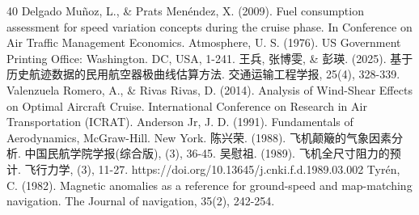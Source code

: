 \documentclass[UTF8]{ctexart}
\begin{document}
\newpage
\begin{thebibliography}{40}
	Delgado Muñoz, L., \& Prats Menéndez, X. (2009). Fuel consumption assessment for speed variation concepts during the cruise phase. In Conference on Air Traffic Management Economics.
	Atmosphere, U. S. (1976). US Government Printing Office: Washington. DC, USA, 1-241.
    王兵, 张博雯, \& 彭瑛. (2025). 基于历史航迹数据的民用航空器极曲线估算方法. 交通运输工程学报, 25(4), 328-339.
	Valenzuela Romero, A., \& Rivas Rivas, D. (2014). Analysis of Wind-Shear Effects on Optimal Aircraft Cruise. International Conference on Research in Air Transportation (ICRAT).
    Anderson Jr, J. D. (1991). Fundamentals of Aerodynamics, McGraw-Hill. New York.
    陈兴荣. (1988). 飞机颠簸的气象因素分析. 中国民航学院学报(综合版), (3), 36-45.
    吴慰祖. (1989). 飞机全尺寸阻力的预计. 飞行力学, (3), 11-27. https://doi.org/10.13645/j.cnki.f.d.1989.03.002
    Tyrén, C. (1982). Magnetic anomalies as a reference for ground-speed and map-matching navigation. The Journal of navigation, 35(2), 242-254.
\end{thebibliography}
\newpage
{}	%
\end{document}
